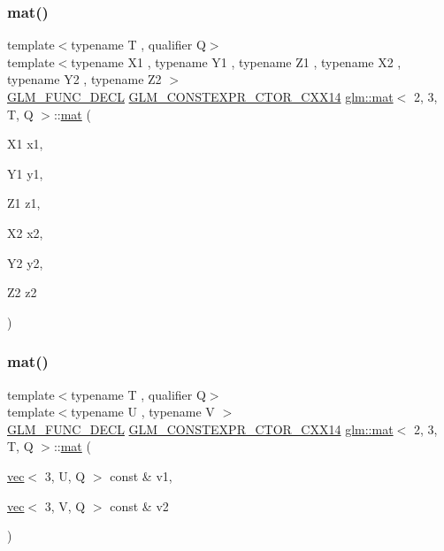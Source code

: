 \mbox{\label{structglm_1_1mat_3_012_00_013_00_01_t_00_01_q_01_4_a142d33e21b0df676faae8f39aa6866b0}} 
\subsubsection{\texorpdfstring{mat()}{mat()}\hspace{0.1cm}{\footnotesize\ttfamily [7/21]}}
{\footnotesize\ttfamily template$<$typename T , qualifier Q$>$ \\
template$<$typename X1 , typename Y1 , typename Z1 , typename X2 , typename Y2 , typename Z2 $>$ \\
\mbox{\hyperlink{setup_8hpp_ab2d052de21a70539923e9bcbf6e83a51}{G\+L\+M\+\_\+\+F\+U\+N\+C\+\_\+\+D\+E\+CL}} \mbox{\hyperlink{setup_8hpp_a0900f9145e68bf6061b6f5e7be3fa751}{G\+L\+M\+\_\+\+C\+O\+N\+S\+T\+E\+X\+P\+R\+\_\+\+C\+T\+O\+R\+\_\+\+C\+X\+X14}} \mbox{\hyperlink{structglm_1_1mat}{glm\+::mat}}$<$ 2, 3, T, Q $>$\+::\mbox{\hyperlink{structglm_1_1mat}{mat}} (\begin{DoxyParamCaption}\item[{X1}]{x1,  }\item[{Y1}]{y1,  }\item[{Z1}]{z1,  }\item[{X2}]{x2,  }\item[{Y2}]{y2,  }\item[{Z2}]{z2 }\end{DoxyParamCaption})}

\mbox{\label{structglm_1_1mat_3_012_00_013_00_01_t_00_01_q_01_4_adac199e52e2fbdfe33f528a5aef395bc}} 
\subsubsection{\texorpdfstring{mat()}{mat()}\hspace{0.1cm}{\footnotesize\ttfamily [8/21]}}
{\footnotesize\ttfamily template$<$typename T , qualifier Q$>$ \\
template$<$typename U , typename V $>$ \\
\mbox{\hyperlink{setup_8hpp_ab2d052de21a70539923e9bcbf6e83a51}{G\+L\+M\+\_\+\+F\+U\+N\+C\+\_\+\+D\+E\+CL}} \mbox{\hyperlink{setup_8hpp_a0900f9145e68bf6061b6f5e7be3fa751}{G\+L\+M\+\_\+\+C\+O\+N\+S\+T\+E\+X\+P\+R\+\_\+\+C\+T\+O\+R\+\_\+\+C\+X\+X14}} \mbox{\hyperlink{structglm_1_1mat}{glm\+::mat}}$<$ 2, 3, T, Q $>$\+::\mbox{\hyperlink{structglm_1_1mat}{mat}} (\begin{DoxyParamCaption}\item[{\mbox{\hyperlink{structglm_1_1vec}{vec}}$<$ 3, U, Q $>$ const \&}]{v1,  }\item[{\mbox{\hyperlink{structglm_1_1vec}{vec}}$<$ 3, V, Q $>$ const \&}]{v2 }\end{DoxyParamCaption})}

